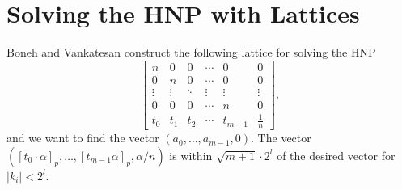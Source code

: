 \section{Solving the HNP with Lattices}
Boneh and Vankatesan construct the following lattice for solving the HNP
\begin{equation}
    \begin{bmatrix}
    n & 0 & 0 & \cdots & 0 & 0 \\
    0 & n & 0 & \cdots & 0 & 0 \\
    \vdots & \vdots & \ddots & \vdots & \vdots & \vdots \\
    0 & 0 & 0 & \cdots & n & 0 \\
    t_0 & t_1 & t_2 & \cdots & t_{m-1} & \frac{1}{n}
    \end{bmatrix},
\end{equation}
and we want to find the vector $(a_0, \ldots, a_{m-1}, 0)$. The vector $([t_0 \cdot \alpha]_p, \dots, [t_{m-1}\alpha]_p, \alpha/n)$ is within $\sqrt{m+1}\cdot 2^l$ of the desired vector for $|k_i| < 2^l$.
